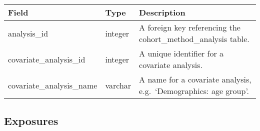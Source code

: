 \documentclass[
]{article}
\begin{document}
\begin{longtable}[]{@{}lll@{}}
\toprule
\begin{minipage}[b]{0.23\columnwidth}\raggedright
Field\strut
\end{minipage} & \begin{minipage}[b]{0.18\columnwidth}\raggedright
Type\strut
\end{minipage} & \begin{minipage}[b]{0.50\columnwidth}\raggedright
Description\strut
\end{minipage}\tabularnewline
\midrule
\endhead
\begin{minipage}[t]{0.23\columnwidth}\raggedright
analysis\_id\strut
\end{minipage} & \begin{minipage}[t]{0.18\columnwidth}\raggedright
integer\strut
\end{minipage} & \begin{minipage}[t]{0.50\columnwidth}\raggedright
A foreign key referencing the cohort\_method\_analysis table.\strut
\end{minipage}\tabularnewline
\begin{minipage}[t]{0.23\columnwidth}\raggedright
covariate\_analysis\_id\strut
\end{minipage} & \begin{minipage}[t]{0.18\columnwidth}\raggedright
integer\strut
\end{minipage} & \begin{minipage}[t]{0.50\columnwidth}\raggedright
A unique identifier for a covariate analysis.\strut
\end{minipage}\tabularnewline
\begin{minipage}[t]{0.23\columnwidth}\raggedright
covariate\_analysis\_name\strut
\end{minipage} & \begin{minipage}[t]{0.18\columnwidth}\raggedright
varchar\strut
\end{minipage} & \begin{minipage}[t]{0.50\columnwidth}\raggedright
A name for a covariate analysis, e.g.~`Demographics: age group'.\strut
\end{minipage}\tabularnewline
\bottomrule
\end{longtable}

\hypertarget{exposures}{%
\subsection{Exposures}\label{exposures}}
\end{document}
